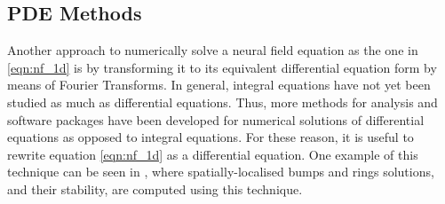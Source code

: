 \documentclass{uonmathreport}
\begin{document}
\subsection{PDE Methods}
\label{subsec: pde methods}
Another approach to numerically solve a neural field equation as the one in \ref{eqn:nf_1d} is by transforming it to its equivalent differential equation form by means of Fourier Transforms. In general, integral equations have not yet been studied as much as differential equations. Thus, more methods for analysis and software packages have been developed for numerical solutions of differential equations as opposed to integral equations. For these reason, it is useful to rewrite equation \ref{eqn:nf_1d} as a differential equation. One example of this technique can be seen in \cite{laing2003pde}, where spatially-localised bumps and rings solutions, and their stability, are computed using this technique.
\end{document}
